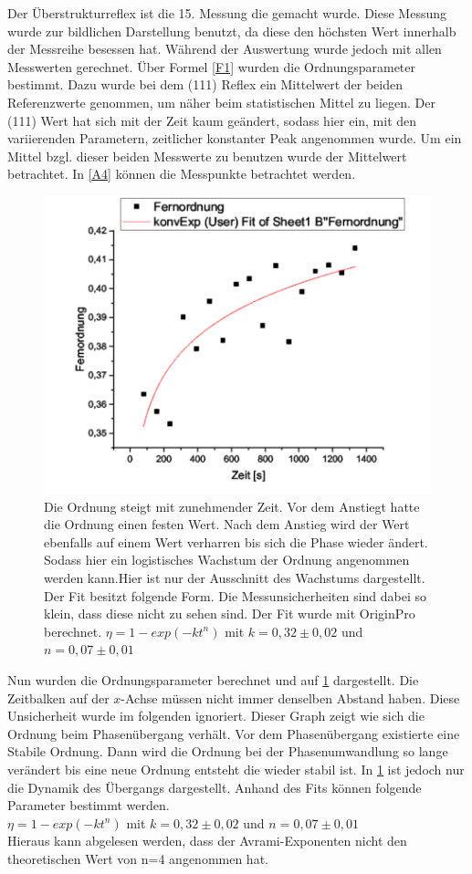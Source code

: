 \documentclass[
	a4paper,
	12pt,
	pagesize,
	ngerman
]{scrartcl}
\begin{document}
Der Überstrukturreflex ist die 15. Messung die gemacht wurde. Diese Messung wurde zur bildlichen Darstellung benutzt, da diese den höchsten Wert innerhalb der Messreihe besessen hat. Während der Auswertung wurde jedoch mit allen Messwerten gerechnet.
Über Formel \cref{F1} wurden die Ordnungsparameter bestimmt. Dazu wurde bei dem (111) Reflex ein Mittelwert der beiden Referenzwerte genommen, um näher beim statistischen Mittel zu liegen. Der (111) Wert hat sich mit der Zeit kaum geändert, sodass hier ein, mit den variierenden Parametern, zeitlicher konstanter Peak angenommen wurde. Um ein Mittel bzgl. dieser beiden Messwerte zu benutzen wurde der Mittelwert betrachtet. In \cref{A4} können die Messpunkte betrachtet werden. 
\begin{figure}[h!]
    \centering
    \includegraphics[scale = 0.7]{fit.png}
    \caption{Die Ordnung steigt mit zunehmender Zeit. Vor dem Anstiegt hatte die Ordnung einen festen Wert. Nach dem Anstieg wird der Wert  ebenfalls auf einem Wert verharren bis sich die Phase wieder ändert. Sodass hier ein logistisches Wachstum der Ordnung angenommen werden kann.Hier ist nur der Ausschnitt des Wachstums dargestellt. Der Fit besitzt folgende Form. Die Messunsicherheiten sind dabei so klein, dass diese nicht zu sehen sind. Der Fit wurde mit OriginPro berechnet.
    $\eta = 1 - exp(-kt^n)$ mit $k=0,32 \pm 0,02$ und $n=0,07 \pm 0,01$}
    \label{A5}
\end{figure}

Nun wurden die Ordnungsparameter berechnet und auf \cref{A5} dargestellt. Die Zeitbalken auf der $x$-Achse müssen nicht immer denselben Abstand haben. Diese Unsicherheit wurde im folgenden ignoriert. Dieser Graph zeigt wie sich die Ordnung beim Phasenübergang verhält. Vor dem Phasenübergang existierte eine Stabile Ordnung. Dann wird die Ordnung bei der Phasenumwandlung so lange verändert bis eine neue Ordnung entsteht die wieder stabil ist. In \cref{A5} ist jedoch nur die Dynamik des Übergangs dargestellt. Anhand des Fits können folgende Parameter bestimmt werden. \\
$\eta = 1 - exp(-kt^n)$ mit $k=0,32 \pm 0,02$ und $n=0,07 \pm 0,01$\\
Hieraus kann abgelesen werden, dass der Avrami-Exponenten nicht den theoretischen Wert von n=4 angenommen hat.
\end{document}
